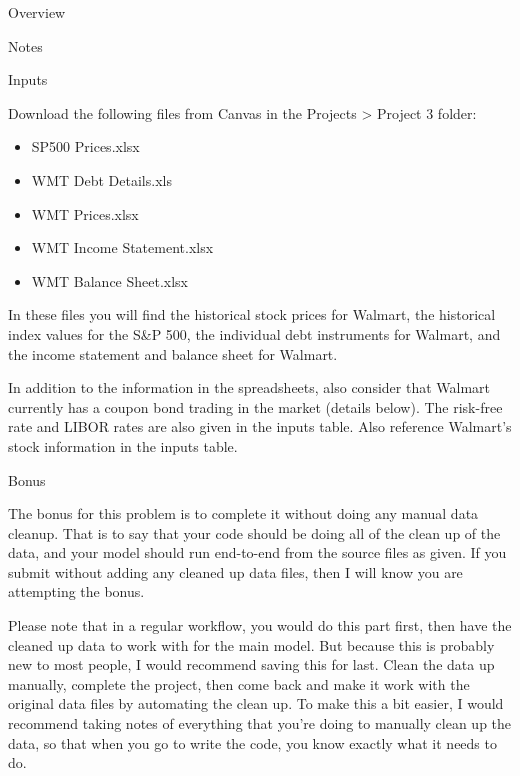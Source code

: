 \documentclass[]{article}
\begin{document}
\begin{section}{Overview}
\begin{subsection}{Notes}
\end{subsection}

\begin{subsection}{Inputs}


Download the following files from Canvas in the Projects > Project 3 folder:
\begin{itemize}
\item SP500 Prices.xlsx
\item WMT Debt Details.xls
\item WMT Prices.xlsx
\item WMT Income Statement.xlsx
\item WMT Balance Sheet.xlsx
\end{itemize}

In these files you will find the historical stock prices for Walmart, the historical index values for the S\&P 500,
the individual debt instruments for Walmart, and the income statement and balance sheet for Walmart.

In addition to the information in the spreadsheets, also consider that Walmart currently has a
coupon bond trading in the market (details below). The risk-free rate
and LIBOR rates are also given in the inputs table.
Also reference Walmart's stock information in the inputs table.


\end{subsection}
\begin{subsection}{Bonus}

The bonus for this problem is to complete it without doing any manual data cleanup. That is to say that your code should
be doing all of the clean up of the data, and your model should run end-to-end from the source files as given. If you 
submit without adding any cleaned up data files, then I will know you are attempting the bonus.

Please note that in a regular workflow, you would do this part first, then have the cleaned up data to work with for the 
main model. But because this is probably new to most people, I would recommend saving this for last. Clean the data up 
manually, complete the project, then come back and make it work with the original data files by automating the
clean up. To make this a bit easier, I would recommend taking notes of everything that you're doing to manually 
clean up the data, so that when you go to write the code, you know exactly what it needs to do.


\end{subsection}
\end{section}
\end{document}
